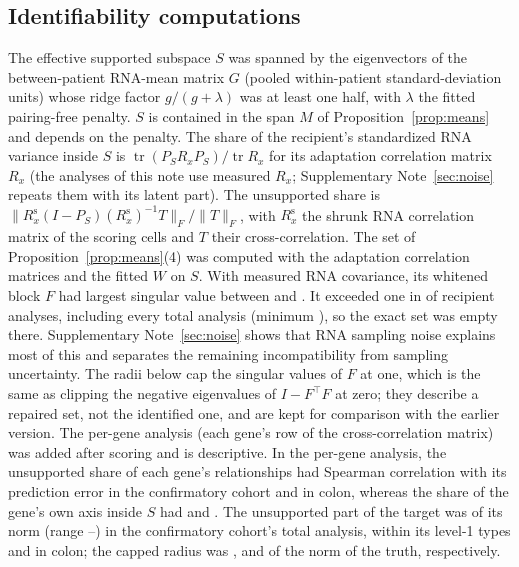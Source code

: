 \subsection*{Identifiability computations}
The effective supported subspace $S$ was spanned by the eigenvectors of the
between-patient RNA-mean matrix $G$ (pooled within-patient standard-deviation
units) whose ridge factor $g/(g+\lambda)$ was at least one half, with
$\lambda$ the fitted pairing-free penalty. $S$ is contained in the span $M$ of
Proposition~\ref{prop:means} and depends on the penalty. The share of the
recipient's standardized RNA variance inside $S$ is
$\operatorname{tr}(P_SR_xP_S)/\operatorname{tr}R_x$ for its adaptation
correlation matrix $R_x$ (the analyses of this note use measured $R_x$;
Supplementary Note~\ref{sec:noise} repeats them with its latent part). The
unsupported share is $\|R_x^{\mathrm{s}}(I-P_S)(R_x^{\mathrm{s}})^{-1}T\|_F/\|T\|_F$,
with $R_x^{\mathrm{s}}$ the shrunk RNA correlation matrix of the scoring cells
and $T$ their cross-correlation. The set of Proposition~\ref{prop:means}(4) was
computed with the adaptation correlation matrices and the fitted $W$ on $S$.
With measured RNA covariance, its whitened block $F$ had largest singular value
between \XsMaxFMin{} and \XsMaxFMax. It exceeded one in \XsMaxFAboveOne{} of
\XsIdUnits{} recipient analyses, including every total analysis (minimum
\XsMaxFTotalMin), so the exact set was empty there. Supplementary
Note~\ref{sec:noise} shows that RNA sampling noise explains most of this and
separates the remaining incompatibility from sampling uncertainty. The radii
below cap the singular values of $F$ at one, which is the same as clipping the
negative eigenvalues of $I-F^\top F$ at zero; they describe a repaired set, not
the identified one, and are kept for comparison with the earlier version. The
per-gene analysis (each gene's row of the cross-correlation matrix) was added
after scoring and is descriptive. In the per-gene analysis, the unsupported
share of each gene's relationships had Spearman correlation
\XsGeneSpearmanUnidHao{} with its prediction error in the confirmatory cohort and
\XsGeneSpearmanUnidColon{} in colon, whereas the share of the gene's own axis
inside $S$ had \XsGeneSpearmanAxisHao{} and \XsGeneSpearmanAxisColon. The
unsupported part of the target was \XsHaoIdFloor{} of its norm (range
\XsHaoIdFloorMin--\XsHaoIdFloorMax) in the confirmatory cohort's total analysis,
\XsHaoWIdFloor{} within its level-1 types and \XsColonIdFloor{} in colon; the
capped radius was \XsHaoIdRadius, \XsHaoWIdRadius{} and \XsColonIdRadius{} of
the norm of the truth, respectively.

